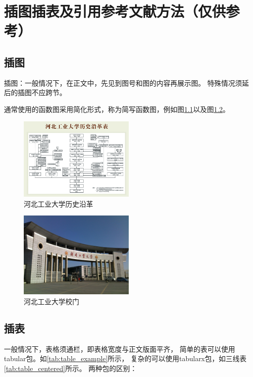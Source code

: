 \chapter{插图插表及引用参考文献方法（仅供参考）}

\section{插图}
插图：一般情况下，在正文中，先见到图号和图的内容再展示图。
特殊情况须延后的插图不应跨节。

通常使用的函数图采用简化形式，称为简写函数图，例如图{\ref{fig:historyhebut}}以及图{\ref{fig:河北工业大学校门}}。
\begin{figure}[H]
    \centering                                                      %
    \includegraphics[width=0.5\textwidth]{figures/historyhebut}     %
    \caption{河北工业大学历史沿革}\label{fig:historyhebut}            %
\end{figure}

\begin{figure}[H]
    \centering
    \includegraphics[width=0.5\textwidth]{figures/河北工业大学校门}
    \caption{河北工业大学校门}\label{fig:河北工业大学校门}
\end{figure}

\section{插表}
一般情况下，表格须通栏，即表格宽度与正文版面平齐，
简单的表可以使用tabular包。如\ref{tab:table_example}所示，
复杂的可以使用tabularx包，如三线表\ref{tab:table_centered}所示。
两种包的区别：

